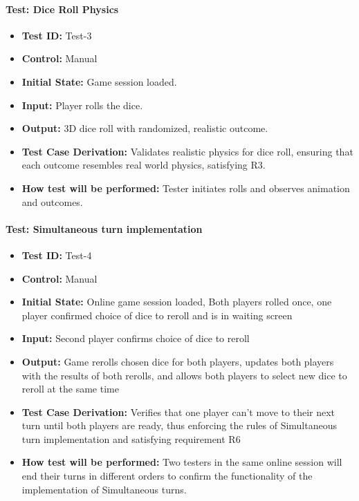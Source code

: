 \documentclass[12pt, titlepage]{article}
\begin{document}
\paragraph{Test: Dice Roll Physics}
\begin{itemize}
    \item \textbf{Test ID:} Test-3
    \item \textbf{Control:} Manual
    \item \textbf{Initial State:} Game session loaded.
    \item \textbf{Input:} Player rolls the dice.
    \item \textbf{Output:} 3D dice roll with randomized, realistic outcome.
    \item \textbf{Test Case Derivation:} Validates realistic physics for dice roll, ensuring that each outcome resembles real world physics, satisfying R3.
    \item \textbf{How test will be performed:} Tester initiates rolls and observes animation and outcomes.
\end{itemize}

\paragraph{Test: Simultaneous turn implementation}
\begin{itemize}
    \item \textbf{Test ID:} Test-4
    \item \textbf{Control:} Manual
    \item \textbf{Initial State:} Online game session loaded, Both players rolled once, one player confirmed choice of dice to reroll and is in waiting screen
    \item \textbf{Input:} Second player confirms choice of dice to reroll 
    \item \textbf{Output:} Game rerolls chosen dice for both players, updates both players with the results of both rerolls, and allows both players to select new dice to reroll at the same time
    \item \textbf{Test Case Derivation:} Verifies that one player can’t move to their next turn until both players are ready, thus enforcing the rules of Simultaneous turn implementation and satisfying requirement R6
    \item \textbf{How test will be performed:} Two testers in the same online session will end their turns in different orders to confirm the functionality of the implementation of Simultaneous turns.
\end{itemize}
\end{document}
